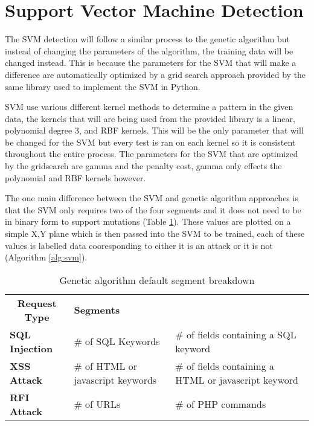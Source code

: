 \section{Support Vector Machine Detection}

The SVM detection will follow a similar process to the genetic algorithm but instead of changing the parameters of the algorithm, the training data will be changed instead.  This is because the parameters for the SVM that will make a difference are automatically optimized by a grid search approach provided by the same library used to implement the SVM in Python. %

SVM use various different kernel methods to determine a pattern in the given data, the kernels that will are being used from the provided library is a linear, polynomial degree 3, and RBF kernels.  This will be the only parameter that will be changed for the SVM but every test is ran on each kernel so it is consistent throughout the entire process.  The parameters for the SVM that are optimized by the gridsearch are gamma and the penalty cost, gamma only effects the polynomial and RBF kernels however.

The one main difference between the SVM and genetic algorithm approaches is that the SVM only requires two of the four segments and it does not need to be in binary form to support mutations (Table \ref{tab:svmSegments}).  These values are plotted on a simple X,Y plane which is then passed into the SVM to be trained, each of these values is labelled data cooresponding to either it is an attack or it is not (Algorithm \ref{alg:svm}).

\begin{table}
	\label{tab:svmSegments}
	\begin{tabular}{|p{1.5in}|p{2.25in}|p{2.25in}|}
	\hline
	\multicolumn{1}{|c|}{\textbf{Request Type}} & \multicolumn{2}{p{4.5in}|}{\textbf{Segments}}               \\ \hhline{|=|=|=|}
	\textbf{SQL Injection}                      & \# of SQL Keywords         & \# of fields containing a SQL keyword \\ \hline
	\textbf{XSS Attack}                      & \# of HTML or javascript keywords         & \# of fields containing a HTML or javascript keyword \\ \hline
	\textbf{RFI Attack}                      & \# of URLs         & \# of PHP commands \\ \hline
	\end{tabular}
	\caption{Genetic algorithm default segment breakdown}
\end{table}

